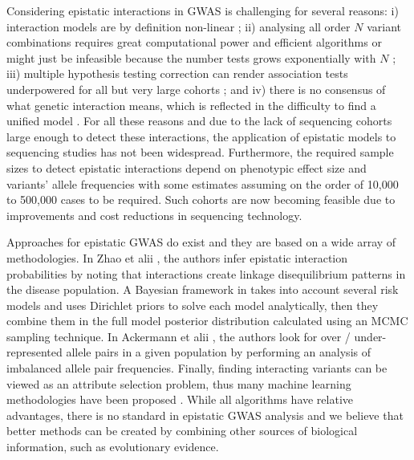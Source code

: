 Considering epistatic interactions in GWAS is challenging for several reasons: 
i) interaction models are by definition non-linear \cite{gao2010classification}; 
ii) analysing all order $N$ variant combinations requires great computational power and efficient algorithms or might just be infeasible because the number tests grows exponentially with $N$ \cite{phillips2008epistasis}; 
iii) multiple hypothesis testing correction can render association tests underpowered for all but very large cohorts \cite{gao2010classification, phillips2008epistasis}; and 
iv) there is no consensus of what genetic interaction means, which is reflected in the difficulty to find a unified model \cite{phillips2008epistasis,mani2008defining}. 
For all these reasons and due to the lack of sequencing cohorts large enough to detect these interactions, the application of epistatic models to sequencing studies has not been widespread. 
Furthermore, the required sample sizes to detect epistatic interactions depend on phenotypic effect size and variants' allele frequencies with some estimates assuming on the order of 10,000 to 500,000 cases \cite{jostins2013using} to be required. 
Such cohorts are now becoming feasible due to improvements and cost reductions in sequencing technology.

Approaches for epistatic GWAS do exist and they are based on a wide array of methodologies. 
In Zhao et alii \cite{zhao2006test}, the authors infer epistatic interaction probabilities by noting that interactions create linkage disequilibrium patterns in the disease population. 
A Bayesian framework in \cite{zhang2007bayesian} takes into account several risk models and uses Dirichlet priors to solve each model analytically, then they combine them in the full model posterior distribution calculated using an MCMC sampling technique. 
In Ackermann et alii \cite{ackermann2012systematic}, the authors look for over / under-represented allele pairs in a given population by performing an analysis of imbalanced allele pair frequencies. 
Finally, finding interacting variants can be viewed as an attribute selection problem, thus many machine learning methodologies have been proposed \cite{mckinney2006machine}. 
While all algorithms have relative advantages, there is no standard in epistatic GWAS analysis and we believe that better methods can be created by combining other sources of biological information, such as evolutionary evidence.

